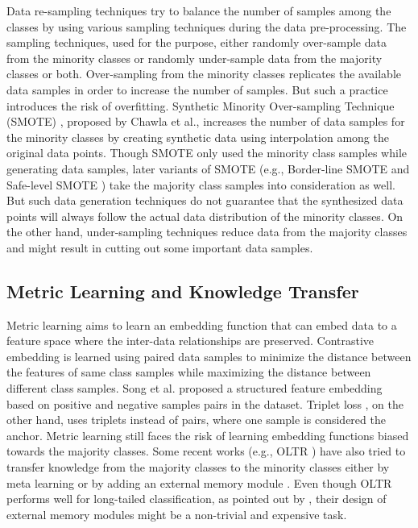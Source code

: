 \documentclass[runningheads]{llncs}
\begin{document}
Data re-sampling techniques try to balance the number of samples among the
classes by using various sampling techniques during the data pre-processing. The
sampling techniques, used for the purpose, either randomly over-sample data from
the minority classes or randomly under-sample data from the majority classes or
both. Over-sampling from the minority classes \cite{Diversity_based_oversampling,Comparing_oversampling_techniques} replicates the 
available
data samples in order to increase the number of samples. But such a practice 
introduces the risk of overfitting. Synthetic Minority Over-sampling Technique 
(SMOTE)
\cite{SMOTE}, proposed by Chawla et al., increases the number of data samples for the 
minority
classes by creating synthetic data using interpolation among the original data 
points.
Though SMOTE only used the minority class samples while generating data samples,
later variants of SMOTE (e.g., Border-line SMOTE \cite{BorderlineSMOTE} and Safe-level SMOTE \cite{SafelevelSMOTE})
take the majority class samples into consideration as well. But such data 
generation
techniques do not guarantee that the synthesized data points will always follow 
the
actual data distribution of the minority classes. On the other hand, 
under-sampling
techniques \cite{Undersampling_1,Undersampling_2} reduce data from the majority classes and might result in 
cutting
out some important data samples.

\subsection{Metric Learning and Knowledge Transfer}

Metric learning aims to learn an embedding function that can embed data to a 
feature space where the inter-data relationships are preserved. Contrastive 
embedding \cite{contrastive} is learned using paired data samples to minimize 
the distance between the features of same class samples while maximizing the 
distance between different class samples. Song et al. \cite{deepmetriclearning} 
proposed a structured feature embedding based on positive and negative samples 
pairs in the dataset. Triplet loss \cite{tripletloss}, on the other hand, uses 
triplets instead of pairs, where one sample is considered the anchor. Metric 
learning still faces the risk of learning embedding functions biased towards the 
majority classes. Some recent works (e.g., OLTR \cite{OLTR}) have also tried to 
transfer knowledge from the majority classes to the minority classes either by 
meta learning \cite{metalearning1} or by adding an external memory module 
\cite{OLTR}. Even though OLTR \cite{OLTR} performs well for long-tailed 
classification, as pointed out by \cite{decoupling}, their design of external 
memory modules might be a non-trivial and expensive task.
\end{document}
